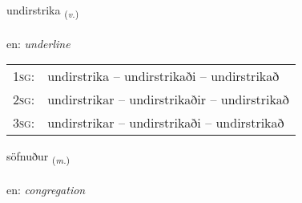\documentclass[frontgrid, backgrid]{flacards}\usepackage[]{graphicx}\usepackage[]{xcolor}
\begin{document}
\renewcommand{\blhead}{\vskip5pt {\small\bfseries\footnotesize Sagnorð | Verb }}
\renewcommand{\bcfoot}{\vskip5pt \hspace{2pt}{\small\bfseries\footnotesize 3K}}


{undirstrika \small{\textsubscript{(\textit{v.})}} \\[1ex] %
 \\
en: \emph{underline} \\  [2ex]
\renewcommand*{\arraystretch}{0.8}
\begin{tabular}{p{1cm}l}
\textsc{1sg}: & undirstrika -- undirstrikaði -- undirstrikað \\ 
\textsc{2sg}: & undirstrikar -- undirstrikaðir -- undirstrikað \\ 
\textsc{3sg}: & undirstrikar -- undirstrikaði -- undirstrikað \\ 
\end{tabular}
}

\renewcommand{\flhead}{\vskip5pt \fboxsep=0pt {\small\bfseries\footnotesize Nafnorð | Noun}}
\renewcommand{\fcfoot}{\vskip5pt \fboxsep=0pt \hspace{2pt}{\small\bfseries\footnotesize 3K}}

\renewcommand{\blhead}{\vskip5pt {\small\bfseries\footnotesize Nafnorð | Noun }}
\renewcommand{\bcfoot}{\vskip5pt \hspace{2pt}{\small\bfseries\footnotesize 3K}}


{söfnuður \small{\textsubscript{(\textit{m.})}} \\[1ex] %
\textphonetic{[sœpnʏðʏr]} \\
en: \emph{congregation} \\  [2ex]
\renewcommand*{\arraystretch}{0.8}
}
\end{document}
